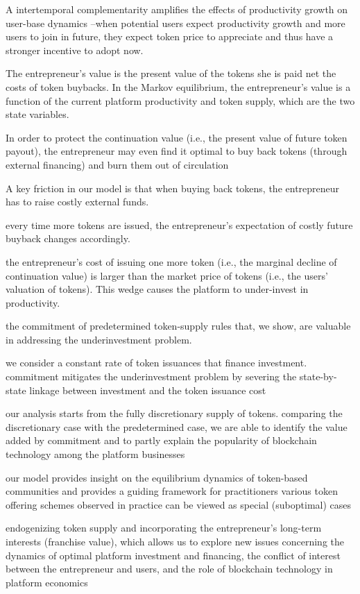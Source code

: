 {A intertemporal complementarity amplifies the effects of productivity growth on user-base dynamics --when potential users expect productivity growth and more users to join in future, they expect token price to appreciate and thus have a stronger incentive to adopt now.

The entrepreneur's value is the present value of the tokens she is paid net the costs of token buybacks. In the Markov equilibrium, the entrepreneur's value is a function of the current platform productivity and token supply, which are the two state variables.

In order to protect the continuation value (i.e., the present value of future token payout), the entrepreneur may even find it optimal to buy back tokens (through external financing) and burn them out of circulation

A key friction in our model is that when buying back tokens, the entrepreneur has to raise costly external funds.

every time more tokens are issued, the entrepreneur's expectation of costly future buyback changes accordingly.

the entrepreneur's cost of issuing one more token (i.e., the marginal decline of continuation value) is larger than the market price of tokens (i.e., the users' valuation of tokens). This wedge causes the platform to under-invest in productivity.

the commitment of predetermined token-supply rules that, we show, are valuable in addressing the underinvestment problem.

we consider a constant rate of token issuances that finance investment. commitment mitigates the underinvestment problem by severing the state-by-state linkage between investment and the token issuance cost

our analysis starts from the fully discretionary supply of tokens. comparing the discretionary case with the predetermined case, we are able to identify the value added by commitment and to partly explain the popularity of blockchain technology among the platform businesses

our model provides insight on the equilibrium dynamics of token-based communities and provides a guiding framework for practitioners various token offering schemes observed in practice can be viewed as special (suboptimal) cases

endogenizing token supply and incorporating the entrepreneur's long-term interests (franchise value), which allows us to explore new issues concerning the dynamics of optimal platform investment and financing, the conflict of interest between the entrepreneur and users, and the role of blockchain technology in platform economics

}
